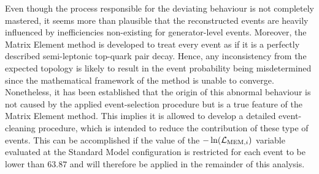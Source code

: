 %

Even though the process responsible for the deviating behaviour is not completely mastered, it seems more than plausible that the reconstructed events are heavily influenced by inefficiencies non-existing for generator-level events. Moreover, the Matrix Element method is developed to treat every event as if it is a perfectly described semi-leptonic top-quark pair decay. 
Hence, any inconsistency from the expected topology is likely to result in the event probability being misdetermined since the mathematical framework of the method is unable to converge.
Nonetheless, it has been established that the origin of this abnormal behaviour is not caused by the applied event-selection procedure but is a true feature of the Matrix Element method.
This implies it is allowed to develop a detailed event-cleaning procedure, which is intended to reduce the contribution of these type of events.
This can be accomplished if the value of the $-\ln(\mathcal{L}_{\textrm{MEM}, i})$ variable evaluated at the Standard Model configuration is restricted for each event to be lower than $63.87$ and will therefore be applied in the remainder of this analysis.


